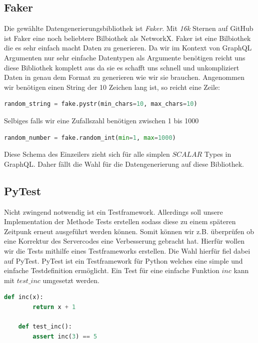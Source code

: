 \subsection{Faker}
Die gewählte Datengenerierungsbibliothek ist \textit{Faker}\cite{fakergithub}.
Mit \textit{16k}\cite{fakergithub} Sternen auf GitHub ist Faker eine noch beliebtere Bilbiothek als NetworkX.
Faker ist eine Bilbiothek die es sehr einfach macht Daten zu generieren.
Da wir im Kontext von GraphQL Argumenten nur sehr einfache Datentypen als Argumente benötigen reicht uns diese
Bibliothek komplett aus da sie es schafft uns schnell und unkompliziert Daten in genau dem Format zu generieren wie wir sie brauchen.
Angenommen wir benötigen einen String der 10 Zeichen lang ist, so reicht eine Zeile:

\begin{lstlisting}[language=Python]
        random_string = fake.pystr(min_chars=10, max_chars=10)
\end{lstlisting}

Selbiges falls wir eine Zufallszahl benötigen zwischen 1 bis 1000

\begin{lstlisting}[language=Python]
        random_number = fake.random_int(min=1, max=1000)
\end{lstlisting}

Diese Schema des Einzeilers zieht sich für alle simplen $SCALAR$ Types in GraphQL.
Daher fällt die Wahl für die Datengenerierung auf diese Bibliothek.

\subsection{PyTest}

Nicht zwingend notwendig ist ein Testframework.
Allerdings soll unsere Implementation der Methode Tests erstellen sodass diese zu einem späteren Zeitpunk erneut ausgeführt werden können.
Somit können wir z.B. überprüfen ob eine Korrektur des Servercodes eine Verbesserung gebracht hat.
Hierfür wollen wir die Tests mithilfe eines Testframeworks erstellen.
Die Wahl hierfür fiel dabei auf PyTest.
PyTest ist ein Testframework für Python welches eine simple und einfache Testdefinition ermöglicht.
Ein Test für eine einfache Funktion $inc$ kann mit $test\_inc$ umgesetzt werden.

\begin{lstlisting}[language=Python]
    def inc(x):
        return x + 1

    def test_inc():
        assert inc(3) == 5
\end{lstlisting}

